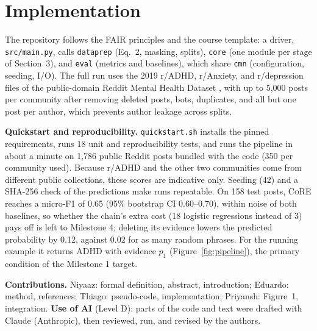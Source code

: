 \documentclass[sigconf]{acmart}
\newcommand{\core}{\textsc{CoRE}}
\begin{document}
\section{Implementation}
The repository follows the FAIR principles \cite{wilkinson2016fair} and the course template: a driver, \texttt{src/main.py}, calls \texttt{dataprep} (Eq.~2, masking, splits), \texttt{core} (one module per stage of Section~3), and \texttt{eval} (metrics and baselines), which share \texttt{cmn} (configuration, seeding, I/O). The full run uses the 2019 r/ADHD, r/Anxiety, and r/depression files of the public-domain Reddit Mental Health Dataset \cite{low2020reddit}, with up to 5,000 posts per community after removing deleted posts, bots, duplicates, and all but one post per author, which prevents author leakage across splits.

\textbf{Quickstart and reproducibility.} \texttt{quickstart.sh} installs the pinned requirements, runs 18 unit and reproducibility tests, and runs the pipeline in about a minute on 1,786 public Reddit posts bundled with the code (350 per community used). Because r/ADHD and the other two communities come from different public collections, these scores are indicative only. Seeding (42) and a SHA-256 check of the predictions make runs repeatable. On 158 test posts, \core{} reaches a micro-F1 of 0.65 (95\% bootstrap CI 0.60--0.70), within noise of both baselines, so whether the chain's extra cost (18 logistic regressions instead of 3) pays off is left to Milestone 4; deleting its evidence lowers the predicted probability by 0.12, against 0.02 for as many random phrases. For the running example it returns ADHD with evidence $p_1$ (Figure~\ref{fig:pipeline}), the primary condition of the Milestone 1 target.

\vspace{1mm}\noindent\textbf{Contributions.} Niyaaz: formal definition, abstract, introduction; Eduardo: method, references; Thiago: pseudo-code, implementation; Priyansh: Figure~1, integration. \textbf{Use of AI} (Level D): parts of the code and text were drafted with Claude (Anthropic), then reviewed, run, and revised by the authors.
\end{document}
